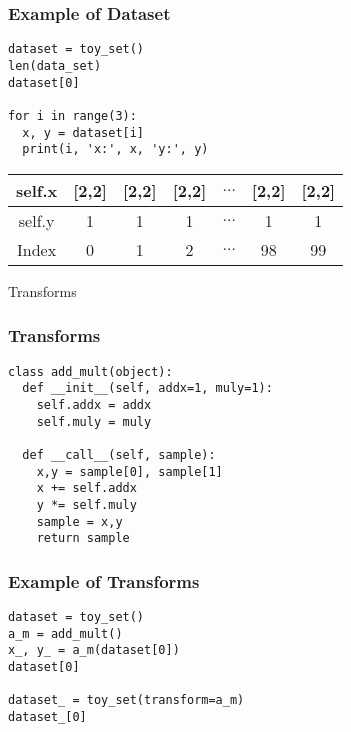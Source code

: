 \documentclass[14 pt]{beamer}
\begin{document}
\begin{frame}[fragile]
  \frametitle{Example of Dataset}
  \begin{block}{}
\begin{verbatim}
dataset = toy_set()
len(data_set)
dataset[0]

for i in range(3):
  x, y = dataset[i]
  print(i, 'x:', x, 'y:', y)
\end{verbatim}
  \end{block}
\begin{table}
  \begin{tabular}{|c|c|c|c|c|c|c|}

\hline
self.x & [2,2] & [2,2] & [2,2] & $\ldots$ & [2,2] & [2,2] \\
\hline
self.y & 1 & 1 & 1 & $\ldots$ & 1 & 1\\
\hline
Index & 0 & 1 & 2 & $\ldots$ & 98 & 99 \\
\hline
  \end{tabular}
\end{table}
\end{frame}

\begin{frame}
\begin{center}
\Large{Transforms}
\end{center}
\end{frame}

\begin{frame}[fragile]
  \frametitle{Transforms}
  \begin{block}{}
\begin{verbatim}
class add_mult(object):
  def __init__(self, addx=1, muly=1):
    self.addx = addx
    self.muly = muly

  def __call__(self, sample):
    x,y = sample[0], sample[1]
    x += self.addx
    y *= self.muly
    sample = x,y
    return sample
\end{verbatim}
  \end{block}
\end{frame}

\begin{frame}[fragile]
  \frametitle{Example of Transforms}
  \begin{block}{}
\begin{verbatim}
dataset = toy_set()
a_m = add_mult()
x_, y_ = a_m(dataset[0])
dataset[0]

dataset_ = toy_set(transform=a_m)
dataset_[0]
\end{verbatim}
  \end{block}
\end{frame}
\end{document}
